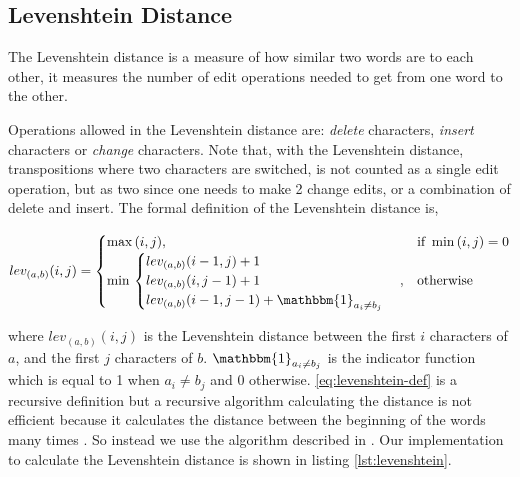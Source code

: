 \subsection{Levenshtein Distance}
The Levenshtein distance is a measure of how similar two words are to each other, it measures the number of edit operations needed to get from one word to the other. 

Operations allowed in the Levenshtein distance are: \emph{delete} characters, \emph{insert} characters or \emph{change} characters. Note that, with the Levenshtein distance, transpositions where two characters are switched, is not counted as a single edit operation, but as two since one needs to make 2 change edits, or a combination of delete and insert. The formal definition of the Levenshtein distance is,

\begin{equation}  
lev_{(a,b)}(i,j) = 
	\begin{cases} 
		\max{(i,j)}, & \text{if}\ \min{(i,j) = 0} \\
		\min{} \begin{cases}
					lev_{(a,b)}(i-1,j) + 1 \\
					lev_{(a,b)}(i,j-1) + 1 \\
					lev_{(a,b)}(i-1,j-1) + \mathbbm{1}_{a_{i} \neq b_{j}} \\
				\end{cases} , & \text{otherwise}
	\end{cases}
\label{eq:levenshtein-def}
\end{equation}

where \(lev_{(a,b)}(i,j)\) is the Levenshtein distance between the first \(i\) characters of \(a\), and the first \(j\) characters of \(b\). \(\mathbbm{1}_{a_{i} \neq b_{j}}\) is the indicator function which is equal to 1 when \(a_{i} \neq b_{j}\) and 0 otherwise.
\eqref{eq:levenshtein-def} is a recursive definition but a recursive algorithm calculating the distance is not efficient because it calculates the distance between the beginning of the words many times \cite{wikiLeven}. So instead we use the algorithm described in \cite{WF1974}. Our implementation to calculate the Levenshtein distance is shown in listing \ref{lst:levenshtein}.
 
